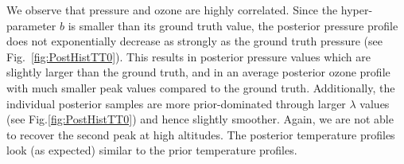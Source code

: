 We observe that pressure and ozone are highly correlated.
Since the hyper-parameter $b$ is smaller than its ground truth value, the posterior pressure profile does not exponentially decrease as strongly as the ground truth pressure (see Fig.~\ref{fig:PostHistTT0}).
This results in posterior pressure values which are slightly larger than the ground truth, and in an average posterior ozone profile with much smaller peak values compared to the ground truth.
Additionally, the individual posterior samples are more prior-dominated through larger $\lambda$ values (see Fig.\ref{fig:PostHistTT0}) and hence slightly smoother.
Again, we are not able to recover the second peak at high altitudes.
The posterior temperature profiles look (as expected) similar to the prior temperature profiles.
\clearpage